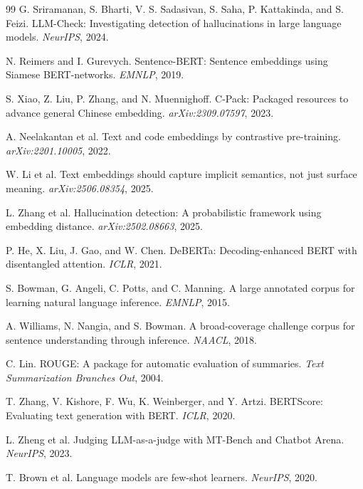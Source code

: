 \documentclass[11pt]{article}
\begin{document}
\begin{thebibliography}{99}
G. Sriramanan, S. Bharti, V. S. Sadasivan, S. Saha, P. Kattakinda, and S. Feizi. LLM-Check: Investigating detection of hallucinations in large language models. \textit{NeurIPS}, 2024.

N. Reimers and I. Gurevych. Sentence-BERT: Sentence embeddings using Siamese BERT-networks. \textit{EMNLP}, 2019.

S. Xiao, Z. Liu, P. Zhang, and N. Muennighoff. C-Pack: Packaged resources to advance general Chinese embedding. \textit{arXiv:2309.07597}, 2023.

A. Neelakantan et al. Text and code embeddings by contrastive pre-training. \textit{arXiv:2201.10005}, 2022.

W. Li et al. Text embeddings should capture implicit semantics, not just surface meaning. \textit{arXiv:2506.08354}, 2025.

L. Zhang et al. Hallucination detection: A probabilistic framework using embedding distance. \textit{arXiv:2502.08663}, 2025.

P. He, X. Liu, J. Gao, and W. Chen. DeBERTa: Decoding-enhanced BERT with disentangled attention. \textit{ICLR}, 2021.

S. Bowman, G. Angeli, C. Potts, and C. Manning. A large annotated corpus for learning natural language inference. \textit{EMNLP}, 2015.

A. Williams, N. Nangia, and S. Bowman. A broad-coverage challenge corpus for sentence understanding through inference. \textit{NAACL}, 2018.

C. Lin. ROUGE: A package for automatic evaluation of summaries. \textit{Text Summarization Branches Out}, 2004.

T. Zhang, V. Kishore, F. Wu, K. Weinberger, and Y. Artzi. BERTScore: Evaluating text generation with BERT. \textit{ICLR}, 2020.

L. Zheng et al. Judging LLM-as-a-judge with MT-Bench and Chatbot Arena. \textit{NeurIPS}, 2023.

T. Brown et al. Language models are few-shot learners. \textit{NeurIPS}, 2020.


\end{thebibliography}
\end{document}

